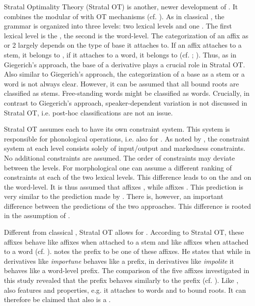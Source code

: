 Stratal Optimality Theory (Stratal OT) is another, newer development of . It combines the modular  of  with OT mechanisms (cf. \citealt{BermudezOtero.2012,BermudezOtero.2013,Kiparsky.2015,BermudezOtero.2017}). As in classical , the grammar is organized into three levels: two lexical levels and one . The first lexical level is the , the second is the word-level. The categorization of an affix as  or 2 largely depends on the type of base it attaches to. If an affix attaches to a stem, it belongs to , if it attaches to a word, it belongs to  (cf. \citealt[7]{Kiparsky.2015}; \citealt[9 f.]{BermudezOtero.2017}).  Thus, as in Giegerich's approach, the base of a derivative plays a crucial role in Stratal OT. Also similar to Giegerich's approach, the categorization of a base as a stem or a word is not always clear. However, it can be assumed that all bound roots are classified as stems. Free-standing words might be classified as words. Crucially, in contrast to Giegerich's approach, speaker-dependent variation is not discussed in Stratal OT, i.e. post-hoc classifications are not an issue.

Stratal OT assumes each  to have its own constraint system. This system is responsible for phonological operations, i.e. also for . As noted by \citet[5]{Kiparsky.2015}, the constraint system at each level consists solely of input/output and markedness constraints. No additional constraints are assumed. The order of constraints may deviate between the levels. For morphological  one can assume a different ranking of constraints at each of the two lexical levels. This difference leads to  on the  and  on the word-level. It is thus assumed that  affixes , while  affixes . This prediction is very similar to the prediction made by . There is, however, an important difference between the predictions of the two approaches. This difference is rooted in the assumption of .

Different from classical , Stratal OT allows for . According to Stratal OT, these affixes behave like  affixes when attached to a stem and like  affixes when attached to a word (cf. \citealt[15, 33]{BermudezOtero.2017}). 
\citet[33]{BermudezOtero.2017} notes the prefix  to be one of these affixes. He states that while in derivatives like \textit{importune}  behaves like a  prefix, in derivatives like \textit{impolite} it behaves like a word-level prefix. The comparison of the five affixes investigated in this study revealed that the prefix  behaves similarly to the prefix  (cf. ). Like ,  also features  and  properties, e.g. it attaches to words and to bound roots. It can therefore be claimed that  also is a .  


